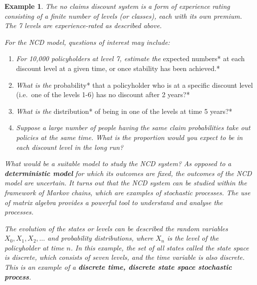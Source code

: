 \documentclass[
]{book}
\theoremstyle{definition}
\theoremstyle{definition}
\newtheorem{example}{Example}[chapter]
\theoremstyle{definition}
\theoremstyle{definition}
\theoremstyle{remark}
\begin{document}
\begin{example}
\emph{The no claims discount system is a form of experience rating consisting
of a finite number of levels (or classes), each with its own premium.
The 7 levels are experience-rated as described above.}

\emph{For the NCD model, questions of interest may include:}

\begin{enumerate}
\def\labelenumi{\arabic{enumi}.}
\item
  \emph{For 10,000 policyholders at level 7, estimate the }expected
  numbers* at each discount level at a given time, or once stability
  has been achieved.*
\item
  \emph{What is the }probability* that a policyholder who is at a specific
  discount level (i.e.~one of the levels 1-6) has no discount after 2
  years?*
\item
  \emph{What is the }distribution* of being in one of the levels at time 5
  years?*
\item
  \emph{Suppose a large number of people having the same claim
  probabilities take out policies at the same time. What is the
  proportion would you expect to be in each discount level in the long
  run?}
\end{enumerate}

\emph{What would be a suitable model to study the NCD system? As opposed to a
\textbf{deterministic model} for which its outcomes are fixed, the outcomes
of the NCD model are uncertain. It turns out that the NCD system can be
studied within the framework of Markov chains, which are examples of
stochastic processes. The use of matrix algebra provides a powerful tool
to understand and analyse the processes.}

\emph{The evolution of the states or levels can be described the random
variables \(X_0, X_1,X_2, \ldots\) and probability distributions, where
\(X_n\) is the level of the policyholder at time \(n\). In this example, the
set of all states called the state space is discrete, which consists of
seven levels, and the time variable is also discrete. This is an example
of a \textbf{discrete time, discrete state space stochastic process}.}

\end{example}
\end{document}
